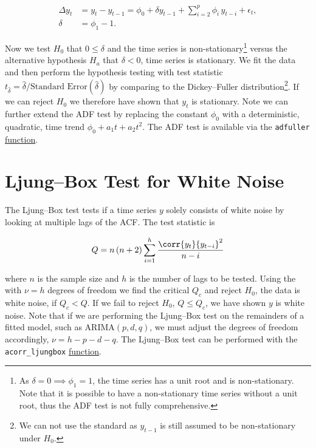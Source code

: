 \begin{subequations}\label{eq:time_series:ADF}
\begin{align}
\Delta y_{t} &= y_{t} - y_{t-1} = \phi_{0} + \delta y_{t-1} + \sum_{i=2}^{p} \phi_{i}\, y_{t-i} + \epsilon_{t}, \label{eq:time_series:ADF:Delta_y} \\
\delta &= \phi_{1} - 1. \label{eq:time_series:ADF:delta}
\end{align}
\end{subequations}

Now we test $H_{0}$ that $0 \leq \delta$ and the time series is
non-stationary\footnote{As $\delta = 0 \implies \phi_{1} = 1$,
\ie the time series has a unit root and is non-stationary.
Note that it is possible to have a non-stationary time series without a unit root,
thus the ADF test is not fully comprehensive.} versus
the alternative hypothesis $H_{a}$ that $\delta < 0$, \ie time series is stationary.
We fit the data and then perform the hypothesis testing with test statistic
$t_{\hat{\delta}} = \hat{\delta} / \text{Standard Error}\left(\hat{\delta}\right)$
by comparing to the Dickey--Fuller distribution\footnote{We can not use the standard \tdist as $y_{t-1}$ is still assumed to be non-stationary under $H_{0}$.}.
If we can reject $H_{0}$ we therefore have shown that $y_{t}$ is stationary.
Note we can further extend the ADF test by replacing the constant $\phi_{0}$
with a deterministic, quadratic, time trend $\phi_{0} + a_{1} t + a_{2} t^{2}$.
The ADF test is available via the \texttt{adfuller}
\href{https://www.statsmodels.org/stable/generated/statsmodels.tsa.stattools.adfuller.html}{function}.

\section{Ljung--Box Test for White Noise}
\label{time_series:ljung_box}

The Ljung--Box test tests if a time series $y$ solely consists of white noise
by looking at multiple lags of the ACF.
The test statistic is

\begin{equation}\label{eq:time_series:ljung_box:Q}
Q = n \left(n+2\right) \sum_{i=1}^{h} \frac{\corr{y_{t}}{y_{t-i}}^{2}}{n-i}
\end{equation}

\noindent where $n$ is the sample size and $h$ is the number of lags to be tested.
Using the \chiSqdist with $\nu = h$ degrees of freedom we find the critical $Q_{c}$
and reject $H_{0}$, the data is white noise, if $Q_{c} < Q$.
If we fail to reject $H_{0}$, \ie $Q \leq Q_{c}$, we have shown $y$ is white noise.
Note that if we are performing the Ljung--Box test on the remainders of a fitted model, such as $\text{ARIMA}\left(p,d,q\right)$,
we must adjust the degrees of freedom accordingly, $\nu = h - p - d - q$.
The Ljung--Box test can be performed with the \texttt{acorr\_ljungbox}
\href{https://www.statsmodels.org/stable/generated/statsmodels.stats.diagnostic.acorr_ljungbox.html}{function}.

